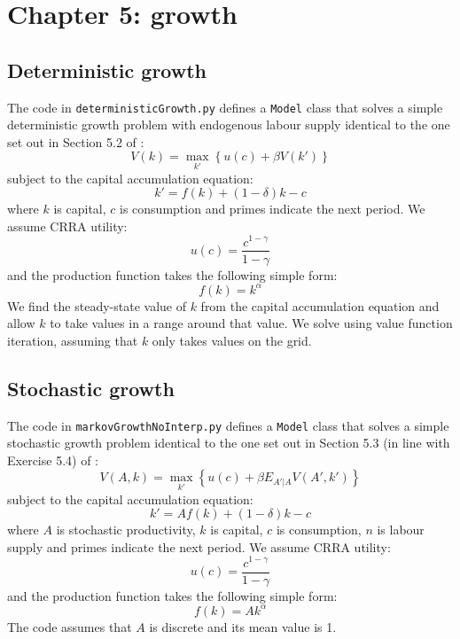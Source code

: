 \section{Chapter 5: growth}

\subsection{Deterministic growth}

The code in \texttt{deterministicGrowth.py} defines a \texttt{Model} class that solves a simple deterministic growth problem with endogenous labour supply identical to the one set out in Section 5.2 of \citet{adda2003dynamic}:
\begin{equation}
	V(k) = \max_{k'} \left\{ u(c) + \beta V(k') \right\}
\end{equation}
subject to the capital accumulation equation:
\begin{equation}
	k' = f(k) + (1 - \delta)k - c
\end{equation}
where \(k\) is capital, \(c\) is consumption and primes indicate the next period. We assume CRRA utility:
\begin{equation}
	u(c) = \frac{c^{1 - \gamma}}{1 - \gamma}
\end{equation}
and the production function takes the following simple form:
\begin{equation}
	f(k) = k^{\alpha}
\end{equation}
We find the steady-state value of \(k\) from the capital accumulation equation and allow \(k\) to take values in a range around that value. We solve using value function iteration, assuming that \(k\) only takes values on the grid.


\subsection{Stochastic growth}

The code in \texttt{markovGrowthNoInterp.py} defines a \texttt{Model} class that solves a simple stochastic growth problem identical to the one set out in Section 5.3 (in line with Exercise 5.4) of \citet{adda2003dynamic}:
\begin{equation}
	V(A, k) = \max_{k'} \left\{ u(c) + \beta E_{A' | A} V(A', k') \right\}
\end{equation}
subject to the capital accumulation equation:
\begin{equation}
	k' = Af(k) + (1 - \delta)k - c
\end{equation}
where \(A\) is stochastic productivity, \(k\) is capital, \(c\) is consumption, \(n\) is labour supply and primes indicate the next period. We assume CRRA utility:
\begin{equation}
	u(c) = \frac{c^{1 - \gamma}}{1 - \gamma}
\end{equation}
and the production function takes the following simple form:
\begin{equation}
	f(k) = A k^{\alpha}
\end{equation}
The code assumes that \(A\) is discrete and its mean value is 1.

